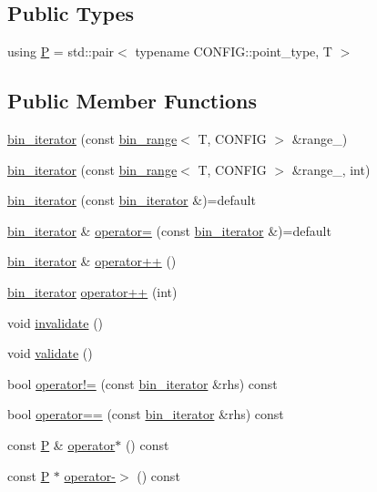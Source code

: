 \subsection*{Public Types}
\begin{DoxyCompactItemize}
\item 
using \hyperlink{structmui_1_1bin__iterator_a647b888410c7aec82b750400f5d5c283}{P} = std\+::pair$<$ typename C\+O\+N\+F\+I\+G\+::point\+\_\+type, T $>$
\end{DoxyCompactItemize}
\subsection*{Public Member Functions}
\begin{DoxyCompactItemize}
\item 
\hyperlink{structmui_1_1bin__iterator_ad4a934e39ea52abb9b9df227826e784b}{bin\+\_\+iterator} (const \hyperlink{structmui_1_1bin__range}{bin\+\_\+range}$<$ T, C\+O\+N\+F\+IG $>$ \&range\+\_\+)
\item 
\hyperlink{structmui_1_1bin__iterator_a28e68216dd247d68b9c60f99c13631c5}{bin\+\_\+iterator} (const \hyperlink{structmui_1_1bin__range}{bin\+\_\+range}$<$ T, C\+O\+N\+F\+IG $>$ \&range\+\_\+, int)
\item 
\hyperlink{structmui_1_1bin__iterator_afb02d18499dea2d212b2d220f69ce749}{bin\+\_\+iterator} (const \hyperlink{structmui_1_1bin__iterator}{bin\+\_\+iterator} \&)=default
\item 
\hyperlink{structmui_1_1bin__iterator}{bin\+\_\+iterator} \& \hyperlink{structmui_1_1bin__iterator_a4d77cf5d472236ac4d8a35bb97d70011}{operator=} (const \hyperlink{structmui_1_1bin__iterator}{bin\+\_\+iterator} \&)=default
\item 
\hyperlink{structmui_1_1bin__iterator}{bin\+\_\+iterator} \& \hyperlink{structmui_1_1bin__iterator_abcbb2de1b131606af75b303f2d8e90e9}{operator++} ()
\item 
\hyperlink{structmui_1_1bin__iterator}{bin\+\_\+iterator} \hyperlink{structmui_1_1bin__iterator_a348e1d15c037b9e1302f16dc065928fb}{operator++} (int)
\item 
void \hyperlink{structmui_1_1bin__iterator_a9dd12ec01e52a6aac8a2aa511b4a0849}{invalidate} ()
\item 
void \hyperlink{structmui_1_1bin__iterator_add20c0285e60fb2bd9e7b82bb9fb4204}{validate} ()
\item 
bool \hyperlink{structmui_1_1bin__iterator_abb2f0a6ce3579fa7f33409da0b295ea1}{operator!=} (const \hyperlink{structmui_1_1bin__iterator}{bin\+\_\+iterator} \&rhs) const
\item 
bool \hyperlink{structmui_1_1bin__iterator_a12ed131569425fd91bd853eef3dd45ef}{operator==} (const \hyperlink{structmui_1_1bin__iterator}{bin\+\_\+iterator} \&rhs) const
\item 
const \hyperlink{structmui_1_1bin__iterator_a647b888410c7aec82b750400f5d5c283}{P} \& \hyperlink{structmui_1_1bin__iterator_a03e75c57f1b080531ea1da1ad7dc8039}{operator$\ast$} () const
\item 
const \hyperlink{structmui_1_1bin__iterator_a647b888410c7aec82b750400f5d5c283}{P} $\ast$ \hyperlink{structmui_1_1bin__iterator_a4bf91868a5ca5e0cca146a11ad1ac24b}{operator-\/$>$} () const
\end{DoxyCompactItemize}
